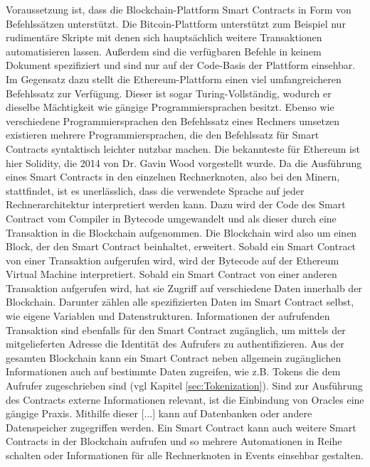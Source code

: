 Voraussetzung ist, dass die Blockchain-Plattform Smart Contracts in Form von 
Befehlssätzen unterstützt. Die Bitcoin-Plattform unterstützt zum Beispiel nur rudimentäre
Skripte mit denen sich hauptsächlich weitere Transaktionen automatisieren lassen. 
Außerdem sind die verfügbaren Befehle in keinem Dokument spezifiziert und sind nur auf
der Code-Basis der Plattform einsehbar.
Im Gegensatz dazu stellt die Ethereum-Plattform einen viel umfangreicheren Befehlssatz
zur Verfügung. Dieser ist sogar Turing-Vollständig, wodurch er dieselbe Mächtigkeit wie gängige
Programmiersprachen besitzt.
Ebenso wie verschiedene Programmiersprachen den Befehlssatz eines Rechners umsetzen
existieren mehrere Programmiersprachen, die den Befehlssatz für Smart Contracts
syntaktisch leichter nutzbar machen. Die bekannteste für Ethereum ist hier Solidity,
die 2014 von Dr. Gavin Wood vorgestellt wurde. Da die Ausführung eines Smart Contracts
in den einzelnen Rechnerknoten, also bei den Minern, stattfindet, ist es unerlässlich, 
dass die verwendete Sprache auf jeder Rechnerarchitektur interpretiert werden kann.
Dazu wird der Code des Smart Contract vom Compiler in 
Bytecode umgewandelt und als dieser durch eine Transaktion in die Blockchain 
aufgenommen. %
Die Blockchain wird also um einen Block, der den Smart Contract beinhaltet, erweitert.
Sobald ein Smart Contract von einer Transaktion aufgerufen wird, wird der Bytecode 
auf der Ethereum Virtual Machine interpretiert.
Sobald ein Smart Contract von einer anderen Transaktion aufgerufen wird, hat sie 
Zugriff auf verschiedene Daten innerhalb der Blockchain. 
Darunter zählen alle spezifizierten Daten im Smart Contract selbst, wie eigene Variablen
und Datenstrukturen. Informationen der aufrufenden Transaktion sind ebenfalls für den
Smart Contract zugänglich, um mittels der mitgelieferten Adresse die Identität des Aufrufers
zu authentifizieren. Aus der gesamten Blockchain kann ein Smart Contract neben
allgemein zugänglichen Informationen auch auf bestimmte Daten zugreifen, wie z.B. 
Tokens die dem Aufrufer zugeschrieben sind (vgl Kapitel \ref{sec:Tokenization}).
Sind zur Ausführung des Contracts externe Informationen relevant, ist die Einbindung von Oracles
eine gängige Praxis. Mithilfe dieser [...] kann auf Datenbanken oder andere Datenspeicher zugegriffen werden.
Ein Smart Contract kann auch weitere Smart Contracts in der Blockchain aufrufen und so 
mehrere Automationen in Reihe schalten oder Informationen für alle Rechnerknoten in Events
einsehbar gestalten.
\cite[p.~57ff]{fill2020blockchain}

